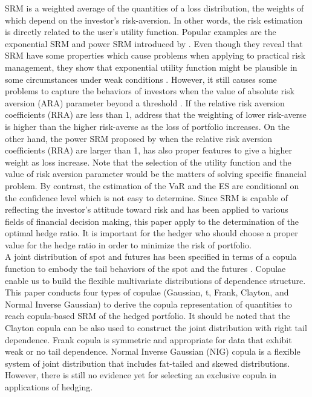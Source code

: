 \documentclass[11pt,a4paper,english]{article}
\begin{document}
SRM is a weighted average of the quantities of a loss distribution, the weights of which depend on the investor's risk-aversion.
In other words, the risk estimation is directly related to the user's utility function.
Popular examples are the exponential SRM and power SRM introduced by \citet{dowd2008spectral}.
Even though they reveal that SRM have some properties which cause problems when applying to practical risk management,
they show that exponential utility function might be plausible in some circumstances under weak conditions \citealp{buhlmann1980economic}.
However, it still causes some problems to capture the behaviors of investors when the value of absolute risk aversion (ARA) parameter beyond a threshold \citealp{markowitz2014mean}.
If the relative risk aversion coefficients (RRA) are less than 1, \citet{dowd2008spectral} address that the weighting of lower risk-averse is higher than the higher risk-averse as the loss of portfolio increases.
On the other hand, the power SRM proposed by \citet{dowd2008spectral} when the relative risk aversion coefficients (RRA) are larger than 1, has also proper features to give a higher weight as loss increase.
Note that the selection of the utility function and the value of risk aversion parameter would be the matters of solving specific financial problem.
By contrast, the estimation of the VaR and the ES are conditional on the confidence level which is not easy to determine.
Since SRM is capable of reflecting the investor's attitude toward risk and has been applied to various fields of financial decision making, this paper apply to the determination of the optimal hedge ratio.
It is important for the hedger who should choose a proper value for the hedge ratio in order to minimize the risk of portfolio.\\

A joint distribution of spot and futures has been specified in terms of a copula function to embody the tail behaviors of the spot and the futures \citealp{barbi2014copula}.
Copulae enable us to build the flexible multivariate distributions of dependence structure.
This paper conducts four types of copulae (Gaussian, t, Frank, Clayton, and Normal Inverse Gaussian) to derive the copula representation of quantities to reach copula-based SRM of the hedged portfolio.
It should be noted that the Clayton copula can be also used to construct the joint distribution with right tail dependence. Frank copula is symmetric and appropriate for data that exhibit weak or no tail dependence. Normal Inverse Gaussian (NIG) copula is a flexible system of joint distribution that includes fat-tailed and skewed distributions. However, there is still no evidence yet for selecting an exclusive copula in applications of hedging.\\
\end{document}
